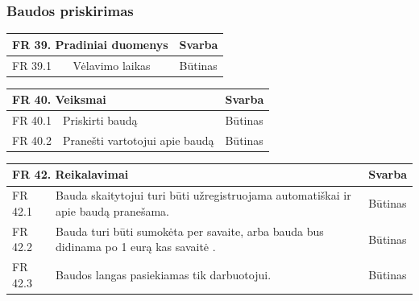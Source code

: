 \documentclass{VUMIFPSkursinis}
\begin{document}
 
 \subsubsection{Baudos priskirimas}
 
 \noindent
 \vspace{5mm}
 \begin{tabular}{ | p{} | p{} | p{} |}
    \hline
    \multicolumn{2}{|l|}{FR 39. Pradiniai duomenys} &Svarba  \\ \hline 
  FR 39.1& Vėlavimo laikas& Būtinas\\ \hline 
  \end{tabular}
    \vspace{5mm}   
 \begin{tabular}{ | p{} | p{} | p{} |}
    \hline
        \multicolumn{2}{|l|}{   FR 40. Veiksmai} &Svarba  \\ \hline 
FR 40.1& Priskirti baudą& Būtinas\\ \hline 
 FR 40.2& Pranešti vartotojui apie baudą& Būtinas\\ \hline 
    \end{tabular}
    \vspace{5mm}  

    \begin{tabular}{ | p{} | p{} | p{} |}
    \hline
     \multicolumn{2}{|l|}{   FR 42. Reikalavimai} &Svarba  \\ \hline 
FR 42.1  &Bauda skaitytojui turi būti užregistruojama automatiškai ir apie baudą pranešama.& Būtinas \\ \hline
FR 42.2 & Bauda turi būti sumokėta per savaite, arba bauda bus didinama po 1 eurą kas savaitė .&Būtinas\\ \hline
FR 42.3 &  Baudos langas pasiekiamas tik darbuotojui. &Būtinas\\ \hline
    \end{tabular}
\end{document}
